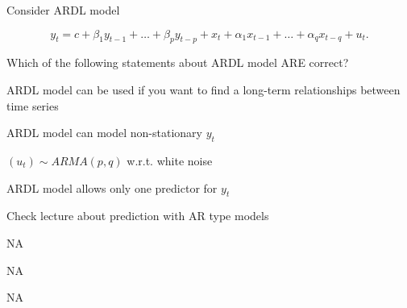 
\begin{question}
Consider ARDL model

\[y_t = c+  \beta_1 y_{t-1} + \ldots + \beta_p y_{t-p} + x_t + \alpha_1 x_{t-1} + \ldots + \alpha_q x_{t-q }  + u_t. \]

Which of the following statements about ARDL model ARE correct?
\begin{answerlist}
  \item ARDL model can be used if you want to find a long-term relationships between time series
  \item ARDL model can model non-stationary \(y_t\)
  \item \((u_t)\sim ARMA(p,q)\) w.r.t. white noise
  \item ARDL model allows only one predictor for \(y_t\)
\end{answerlist}
\end{question}

\begin{solution}
\begin{answerlist}
  \item Check lecture about prediction with AR type models
  \item NA
  \item NA
  \item NA
\end{answerlist}
\end{solution}


